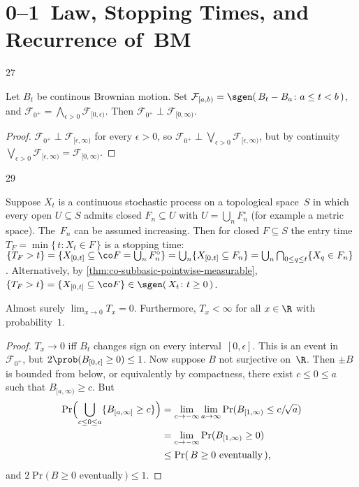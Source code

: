 \section	{0--1~Law, Stopping Times, and Recurrence of~BM}

\setcounter	{block}	{27}
\begin	{theorem}[0--1~law]
Let $B_t$ be continous Brownian motion.
Set \( \mathcal F_{[a,b)} = \sgen(\, B_t - B_a \colon a \le t < b \,) \),
and \( \mathcal F_{0^+} = \bigwedge_{\epsilon>0} \mathcal F_{[0,\epsilon)} \).
Then \( \mathcal F_{0^+} \perp \mathcal F_{[0,\infty)} \).
\end	{theorem}
\begin	{proof}
\( \mathcal F_{0^+} \perp \mathcal F_{[\epsilon,\infty)} \)
for every \( \epsilon > 0 \),
so \( \mathcal F_{0^+}
\perp \bigvee_{\epsilon>0} \mathcal F_{[\epsilon,\infty)} \),
but by continuity \( \bigvee_{\epsilon>0} \mathcal F_{[\epsilon,\infty)}
= \mathcal F_{[0,\infty)} \).
\end	{proof}

\setcounter	{block}	{29}
\begin	{remark}
Suppose $X_t$ is a continuous stochastic process
on a topological space~$S$
in which every open \( U \subseteq S \) admits closed \( F_n \subseteq U \)
with \( U = \bigcup_n F_n^\circ \)
(for example a metric space).
The~$F_n$ can be assumed increasing.
Then for closed \( F \subseteq S \)
the entry time \( T_F = \min\{\, t \colon X_t \in F \,\} \)
is a stopping time:
\(	\{ T_F > t \}
=	\{ X_{[0,t]} \subseteq \co F = \bigcup_n F_n^\circ \}
=	\bigcup_n \{ X_{[0,t]} \subseteq F_n \}
=	\bigcup_n \bigcap_{0\le q\le t} \{ X_q \in F_n \}
\).
Alternatively, by \autoref{thm:co-subbasic-pointwise-measurable},
\( \{T_F > t\} = \{X_{[0,t]} \subseteq \co F\}
\in \sgen(\, X_t \colon t \ge 0 \,) \).
\end	{remark}

\begin	{proposition}
Almost surely \( \lim_{x\to0} T_x = 0 \).
Furthermore, \( T_x < \infty \) for all \( x \in \R \)
with probability~$1$.
\end	{proposition}
\begin	{proof}
\( T_x \to 0 \) iff $B_t$ changes sign on every interval~$[0,\epsilon]$.
This is an event in~$\mathcal F_{0^+}$,
but \( 2\prob(B_{[0,\epsilon]} \ge 0) \le 1 \).
Now suppose $B$ not surjective on~$\R$.
Then \( \pm B \) is bounded from below,
or equivalently by compactness,
there exist \( c \le 0 \le a \) such that \( B_{[a,\infty)} \ge c \).
But
\begin	{align*}
	\Pr\Bigl( \bigcup_{c \le 0 \le a} \{ B_{[a,\infty]} \ge c \} \Bigr)
	&=	\lim_{c\to-\infty} \lim_{a\to\infty}
			\Pr( B_{[1,\infty)} \le c/\!\sqrt a ) \\
	&=	\lim_{c\to-\infty}
			\Pr( B_{[1,\infty)} \ge 0 ) \\
	&\le	\Pr(\,\text{\( B \ge 0 \) eventually}\,) \text,
\end	{align*}
and \( 2\Pr(\, B \ge 0 \) eventually\(\,) \le 1 \).
\end	{proof}
